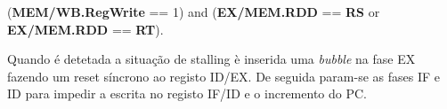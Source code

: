 \documentclass[10pt,a4paper]{book}
\begin{document}
	(\textbf{MEM/WB.RegWrite} == 1) and (\textbf{EX/MEM.RDD} == \textbf{RS} or \textbf{EX/MEM.RDD} == \textbf{RT}).

	Quando é detetada a situação de stalling è inserida uma \textit{bubble} na fase EX fazendo um reset síncrono ao registo ID/EX. De seguida param-se as fases IF e ID para impedir a escrita no registo IF/ID e o incremento do PC.











 		\printindex
\end{document}
